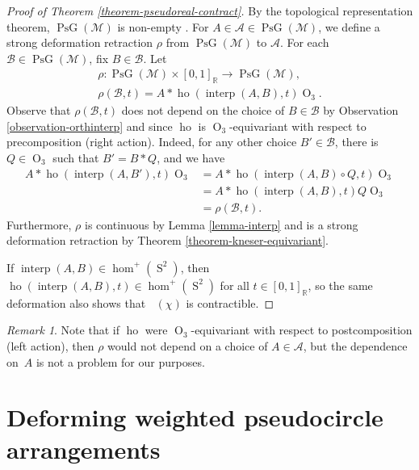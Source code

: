 \documentclass[JEP,XML,SOM,Unicode,NoFloatCountersInSection,published]{cedram}
\theoremstyle{remark}
\newtheorem{remark}[theorem]{Remark}
\let\mc\mathcal
\let\mb\mathbb
\DeclareMathOperator{\realo}{PsG}
\DeclareMathOperator{\pog}{Ps\widetilde G}
\DeclareMathOperator{\orth}{O}
\DeclareMathOperator{\sphere}{S}
\DeclareMathOperator{\interp}{interp}
\DeclareMathOperator{\ho}{ho}
\begin{document}

\begin{proof}[Proof of Theorem \ref{theorem-pseudoreal-contract}]
By the topological representation theorem, $\realo(\mc{M})$ is non-empty \cite{folkman1978oriented}.
For $A \in \mc{A} \in \realo(\mc{M})$, we define a strong deformation retraction $\rho$ from $\realo(\mc{M})$ to $\mc{A}$.
For each $\mc{B} \in \realo(\mc{M})$, fix $B \in \mc{B}$. Let
\begin{gather*}
\rho : \realo(\mc{M}) \times [0,1]_\mb{R} \to \realo(\mc{M}),\\\rho(\mc{B},t) = A*\ho(\interp(A,B),t)\orth_3.
\end{gather*}
Observe that $\rho(\mc{B},t)$ does not depend on the choice of $B \in \mc{B}$ by Observation \ref{observation-orthinterp} and since $\ho$ is $\orth_3$-equivariant with respect to precomposition (right action). Indeed, for any other choice $B' \in \mc{B}$, there is $Q \in \orth_3$ such that $B' = B*Q$, and we have
\begin{align*}
A*\ho(\interp(A,B'),t)\orth_3
&= A*\ho(\interp(A,B) \circ Q,t)\orth_3 \\
&= A*\ho(\interp(A,B),t)Q\orth_3 \\
&= \rho(\mc{B},t).
\end{align*}
Furthermore, $\rho$ is continuous by Lemma \ref{lemma-interp} and is a strong deformation retraction by Theorem \ref{theorem-kneser-equivariant}.

If $\interp(A,B) \in \hom^+(\sphere^2)$, then $\ho(\interp(A,B),t) \in \hom^+(\sphere^2)$ for all $t \in [0,1]_\mb{R}$,
so the same deformation also shows that $\pog(\chi)$ is contractible.
\end{proof}

\begin{remark}
Note that if $\ho$ were $\orth_3$-equivariant with respect to postcomposition (left action), then $\rho$ would not depend on a choice of $A \in \mc{A}$, but the dependence on~$A$ is not a problem for our purposes.
\end{remark}

\section{Deforming weighted pseudocircle arrangements}\label{section-deforming}
\end{document}
